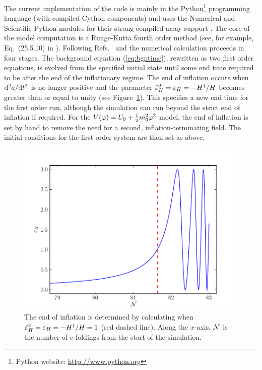 The current implementation of the code is mainly in the Python\footnote{Python
website: \url{http://www.python.org}} programming language (with compiled Cython
components) and uses the
Numerical and Scientific Python modules for their strong compiled array support
\cite{scipy}. The core of the model computation is a
Runge-Kutta fourth order method (see, for example, Eq.~(25.5.10) in
\cite{abramowitz+stegun}).  Following
Refs.~\cite{Martin:2006rs} and \cite{Ringeval:2007am} the numerical calculation
proceeds in four stages. The background equation (\ref{eq:bgntime}),
rewritten as two first order equations, is
evolved from the specified initial state until some end time required
to be after the end of the inflationary regime.  The end of inflation
occurs when $\mathrm{d}^2a/\mathrm{d} t^2$ is no longer positive and the parameter
$\bar{\varepsilon}^2_H = \varepsilon_H= -H^{\dagger}/H$ becomes greater than or
equal to unity
(see Figure~\ref{fig:eps}). This specifies a new end time for the first
order run, although the simulation can run beyond the strict end of
inflation if required. For the $V(\varphi)=U_0 + \frac{1}{2} m_0^2 \varphi^2$ model, the end of inflation is
set by hand to remove the need for a second, inflation-terminating field. The initial
conditions for the first order system are then set as above.
%
\begin{figure}[tb]
\centering
 \includegraphics[width=\textwidth]{./numerical/graphs/bgepsilon}
 \caption[Plot of $\varepsilon_H$ near the end of inflation]{The end of
inflation is
determined by calculating when
   $\bar{\varepsilon}^2_H = \varepsilon_H=-H^{\dagger}/H=1$ (red dashed line). Along the
$x$-axis,
   $\mathcal{N}$ is the number of e-foldings from the start of the
   simulation.}
\label{fig:eps}
\end{figure}


